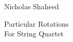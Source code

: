 \newcommand*{\titleTH}{\begingroup %
\raggedleft %
\vspace*{\baselineskip} %

{\Large Nicholas Shaheed}\\[0.167\textheight] %


\vfill %

{\fontsize{55}{115}\selectfont Particular Rotations}\\[\baselineskip] %

{\Large For String Quartet}\par %

\vfill %

{\large \yr}\par %

\vspace*{3\baselineskip} %
\endgroup}


 

\pagestyle{empty} %


\titleTH %



